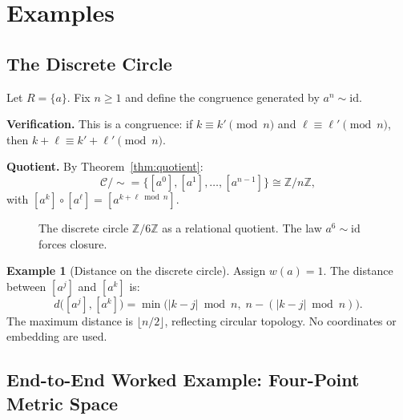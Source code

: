 \documentclass{article}
\theoremstyle{definition}
\newtheorem{example}[theorem]{Example}
\theoremstyle{remark}
\newcommand{\RC}{\mathcal{C}}
\newcommand{\id}{\mathrm{id}}
\begin{document}
\section{Examples}
\label{sec:examples}

\subsection{The Discrete Circle}
\label{sec:circle}

Let $R = \{a\}$. Fix $n \geq 1$ and define the congruence
generated by $a^n \sim \id$.

\textbf{Verification.} This is a congruence: if
$k \equiv k' \pmod{n}$ and $\ell \equiv \ell' \pmod{n}$, then
$k+\ell \equiv k'+\ell' \pmod{n}$.

\textbf{Quotient.} By Theorem~\ref{thm:quotient}:
\[
  \RC/{\sim} = \{[a^0],[a^1],\dots,[a^{n-1}]\}
  \cong \mathbb{Z}/n\mathbb{Z},
\]
with $[a^k] \circ [a^\ell] = [a^{k+\ell \bmod n}]$.

\begin{figure}[h]
\centering
{}
\caption{The discrete circle $\mathbb{Z}/6\mathbb{Z}$ as a
relational quotient. The law $a^6 \sim \id$ forces closure.}
\label{fig:circle}
\end{figure}

\begin{example}[Distance on the discrete circle]
\label{ex:circle-distance}
Assign $w(a) = 1$. The distance between $[a^j]$ and $[a^k]$ is:
\[
  d\bigl([a^j],[a^k]\bigr)
  = \min\!\bigl(|k-j| \bmod n,\; n - (|k-j| \bmod n)\bigr).
\]
The maximum distance is $\lfloor n/2 \rfloor$, reflecting circular
topology. No coordinates or embedding are used.
\end{example}

\subsection{End-to-End Worked Example: Four-Point Metric Space}
\label{sec:worked}
\end{document}
